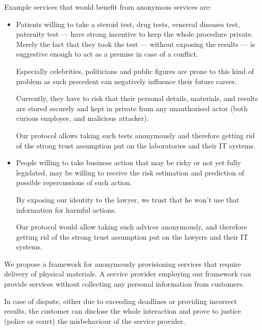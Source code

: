 \documentclass{ieeeaccess}
\begin{document}
Example services that would benefit from anonymous services are:
\begin{itemize}
    \item Patients willing to take a steroid test, drug tests, venereal diseases
test, paternity test — have strong incentive to keep the whole
procedure private. Merely the fact that they took the test — without
exposing the results — is suggestive enough to act as a premise in
case of a conflict.

Especially celebrities, politicians and public figures are prone to this kind of problem as such precedent can negatively influence their future career.

Currently, they have to risk that their personal details, materials, and results are stored securely and kept in private from any unauthorised actor (both curious employee, and malicious attacker).

Our protocol allows taking such tests anonymously and therefore getting
rid of the strong trust assumption put on the laboratories and their IT
systems.
\item People willing to take business action that may be risky or not yet fully legislated, may be willing to receive the risk estimation and prediction of possible repercussions of such action.

By exposing our identity to the lawyer, we trust that he won't use that
information for harmful actions.

Our protocol would allow taking such advices anonymously, and therefore
getting rid of the strong trust assumption put on the lawyers and their IT systems.
\end{itemize}

We propose a framework for anonymously provisioning services that require delivery of physical materials. A service provider employing our framework can provide services without collecting any personal information from customers.

In case of dispute, either due to exceeding deadlines or providing
incorrect results, the customer can disclose the whole interaction and
prove to justice (police or court) the misbehaviour of the service
provider.
\end{document}
